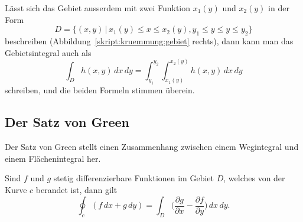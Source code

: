 Lässt sich das Gebiet ausserdem mit zwei Funktion $x_1(y)$ und $x_2(y)$
in der Form
\[
D=\{(x,y)\,|\, x_1(y)\le x\le x_2(y), y_1\le y\le y\le y_2\}
\]
beschreiben (Abbildung~\ref{skript:kruemmung:gebiet} rechts),
dann kann man das Gebietsintegral auch als
\[
\int_Dh(x,y)\,dx\,dy
=
\int_{y_1}^{y_2}\int_{x_1(y)}^{x_2(y)} h(x,y)\,dx\,dy
\]
schreiben, und die beiden Formeln stimmen überein.

\subsection{Der Satz von Green%
\label{skript:kruemmung:section:green}}
Der Satz von Green stellt einen Zusammenhang zwischen einem Wegintegral
und einem Flächenintegral her.

\begin{satz}[Green]
\label{skript:kruemmung:satz:green}
Sind $f$ und $g$ stetig differenzierbare Funktionen im Gebiet $D$, welches
von der Kurve $c$ berandet ist, dann gilt
\[
\oint_c (f\,dx + g\,dy)
=
\int_D \biggl(\frac{\partial g}{\partial x}
   -\frac{\partial f}{\partial y}\biggr)\,dx\,dy.
\]
\end{satz}
%

